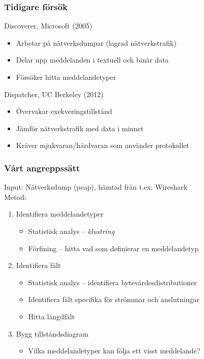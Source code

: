 \documentclass[xetex, 8pt]{beamer}
\begin{document}
    \begin{frame}
        \frametitle{Tidigare försök}
        Discoverer, Microsoft (2005)
        \begin{itemize}
            \item Arbetar på nätverksdumpar (lagrad nätverkstrafik)
            \item Delar upp meddelanden i textuell och binär data
            \item Försöker hitta meddelandetyper
        \end{itemize}
        \vskip20pt
        Dispatcher, UC Berkeley (2012)
        \begin{itemize}
            \item Övervakar exekveringstillstånd
            \item Jämför nätverkstrafik med data i minnet
            \item Kräver mjukvaran/hårdvaran som använder protokollet
        \end{itemize}
    \end{frame}

    \begin{frame}
        \frametitle{Vårt angreppssätt}
        Input: Nätverksdump (pcap), hämtad från t.ex. Wireshark\\
        Metod:
        \begin{enumerate}
            \item Identifiera meddelandetyper
                \begin{itemize}
                    \item Statistisk analys -- \emph{klustring}
                    \item Förfining -- hitta vad som definierar en meddelandetyp
                \end{itemize}
            \item Identifiera fält
                \begin{itemize}
                    \item Statistisk analys -- identifiera bytevärdesdistributioner
                    \item Identifiera fält specifika för strömmar och anslutningar
                    \item Hitta längdfält
                \end{itemize}
            \item Bygg tillståndsdiagram
                \begin{itemize}
                    \item Vilka meddelandetyper kan följa ett visst meddelande?
                \end{itemize}
        \end{enumerate}
    \end{frame}
    
\end{document}
